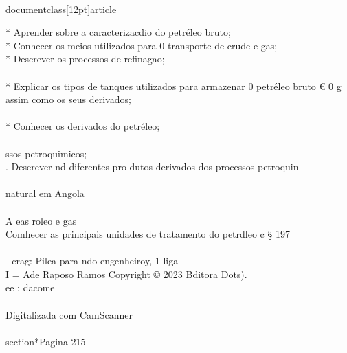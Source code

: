 \\documentclass[12pt]{article}
\begin{document}
* Aprender sobre a caracterizacdio do petréleo bruto;\\
* Conhecer os meios utilizados para 0 transporte de crude e gas;\\
* Descrever os processos de refinagao;\\
\\
* Explicar os tipos de tanques utilizados para armazenar 0 petréleo bruto € 0 g\\
assim como os seus derivados;\\
\\
* Conhecer os derivados do petréleo;\\
\\
ssos petroquimicos;\\
. Deserever nd diferentes pro dutos derivados dos processos petroquin\\
\\
natural em Angola\\
\\
A eas roleo e gas\\
Comhecer as principais unidades de tratamento do petrdleo ¢ § 197\\
\\
- crag: Pilea para ndo-engenheiroy, 1 liga\\
I = Ade Raposo Ramos Copyright © 2023 Bditora Dots).\\
ee : dacome\\
\\
Digitalizada com CamScanner\\

\\section*{Pagina 215}
\end{document}

